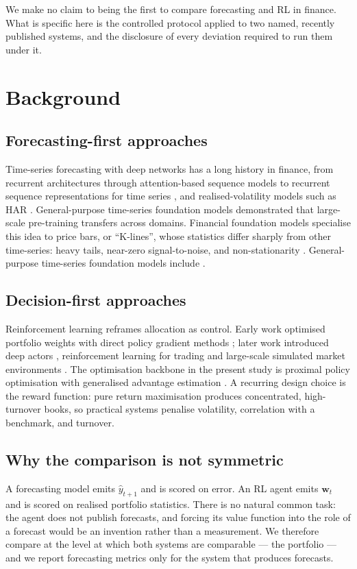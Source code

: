 \documentclass[conference]{IEEEtran}
\begin{document}
We make no claim to being the first to compare forecasting and RL in finance.
What is specific here is the controlled protocol applied to two named,
recently published systems, and the disclosure of every deviation required to
run them under it.

\section{Background}
\label{sec:background}
\subsection{Forecasting-first approaches}
Time-series forecasting with deep networks has a long history in finance, from
recurrent architectures \cite{chung2014gru,fischer2018lstm} through
attention-based sequence models \cite{nie2023patchtst,liu2024itransformer} to
recurrent sequence representations for time series \cite{feng2019rsr}, and
realised-volatility models such as HAR \cite{corsi2009har}. General-purpose
time-series foundation models demonstrated that large-scale pre-training
transfers across domains. Financial foundation models specialise this idea to
price bars, or ``K-lines'', whose statistics differ sharply from other
time-series: heavy tails, near-zero signal-to-noise, and non-stationarity
\cite{shi2025kronos}. General-purpose time-series foundation models include
\cite{ansari2024chronos,das2024timesfm,woo2024moirai}.

\subsection{Decision-first approaches}
Reinforcement learning reframes allocation as control. Early work optimised
portfolio weights with direct policy gradient methods \cite{moody2001direct};
later work introduced deep actors \cite{jiang2017portfolio}, reinforcement
learning for trading \cite{zhang2020drltrading} and large-scale simulated market
environments \cite{liu2021finrl}. The optimisation backbone in the present study
is proximal policy optimisation \cite{schulman2017ppo} with generalised
advantage estimation \cite{schulman2016gae}. A recurring design choice is the reward function: pure return
maximisation produces concentrated, high-turnover books, so practical systems
penalise volatility, correlation with a benchmark, and turnover.

\subsection{Why the comparison is not symmetric}
A forecasting model emits $\hat{y}_{t+1}$ and is scored on error. An RL agent
emits $\mathbf{w}_t$ and is scored on realised portfolio statistics. There is
no natural common task: the agent does not publish forecasts, and forcing its
value function into the role of a forecast would be an invention rather than a
measurement. We therefore compare at the level at which both systems are
comparable --- the portfolio --- and we report forecasting metrics only for the
system that produces forecasts.
\end{document}
